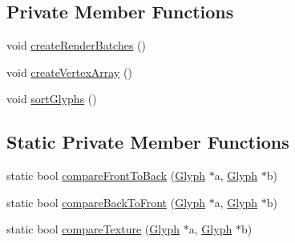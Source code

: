 \subsection*{Private Member Functions}
\begin{DoxyCompactItemize}
\item 
void \hyperlink{class_otherwise_1_1_sprite_batch_a84e7edc2ebd61683542f552c1073b169}{create\+Render\+Batches} ()
\item 
void \hyperlink{class_otherwise_1_1_sprite_batch_a950f90bb29e4253c4fd8db23fe499630}{create\+Vertex\+Array} ()
\item 
void \hyperlink{class_otherwise_1_1_sprite_batch_a9558cb9c9930c2280c51371268ee8db1}{sort\+Glyphs} ()
\end{DoxyCompactItemize}
\subsection*{Static Private Member Functions}
\begin{DoxyCompactItemize}
\item 
static bool \hyperlink{class_otherwise_1_1_sprite_batch_a4969fc26abec87de6f65c5cc0f96495a}{compare\+Front\+To\+Back} (\hyperlink{class_otherwise_1_1_glyph}{Glyph} $\ast$a, \hyperlink{class_otherwise_1_1_glyph}{Glyph} $\ast$b)
\item 
static bool \hyperlink{class_otherwise_1_1_sprite_batch_af2ba50dbf2c5b5ca54c8a378b00b1586}{compare\+Back\+To\+Front} (\hyperlink{class_otherwise_1_1_glyph}{Glyph} $\ast$a, \hyperlink{class_otherwise_1_1_glyph}{Glyph} $\ast$b)
\item 
static bool \hyperlink{class_otherwise_1_1_sprite_batch_ad5f1109914194f6d6675be1ebf45caa8}{compare\+Texture} (\hyperlink{class_otherwise_1_1_glyph}{Glyph} $\ast$a, \hyperlink{class_otherwise_1_1_glyph}{Glyph} $\ast$b)
\end{DoxyCompactItemize}
